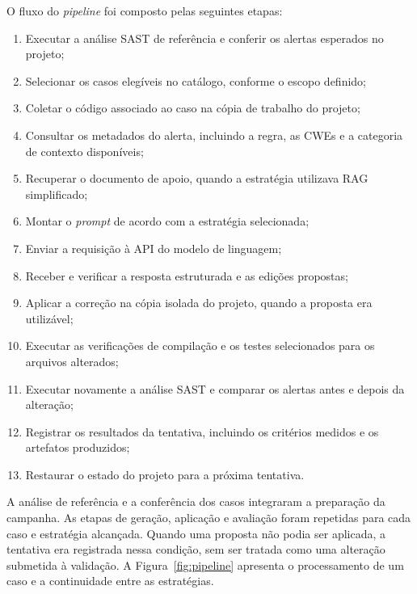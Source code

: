 O fluxo do \textit{pipeline} foi composto pelas seguintes etapas:

\begin{enumerate}
    \item Executar a análise SAST de referência e conferir os alertas esperados no projeto;
    \item Selecionar os casos elegíveis no catálogo, conforme o escopo definido;
    \item Coletar o código associado ao caso na cópia de trabalho do projeto;
    \item Consultar os metadados do alerta, incluindo a regra, as CWEs e a categoria de contexto disponíveis;
    \item Recuperar o documento de apoio, quando a estratégia utilizava RAG simplificado;
    \item Montar o \textit{prompt} de acordo com a estratégia selecionada;
    \item Enviar a requisição à API do modelo de linguagem;
    \item Receber e verificar a resposta estruturada e as edições propostas;
    \item Aplicar a correção na cópia isolada do projeto, quando a proposta era utilizável;
    \item Executar as verificações de compilação e os testes selecionados para os arquivos alterados;
    \item Executar novamente a análise SAST e comparar os alertas antes e depois da alteração;
    \item Registrar os resultados da tentativa, incluindo os critérios medidos e os artefatos produzidos;
    \item Restaurar o estado do projeto para a próxima tentativa.
\end{enumerate}

A análise de referência e a conferência dos casos integraram a preparação da campanha. As etapas de geração, aplicação e avaliação foram repetidas para cada caso e estratégia alcançada. Quando uma proposta não podia ser aplicada, a tentativa era registrada nessa condição, sem ser tratada como uma alteração submetida à validação. A Figura~\ref{fig:pipeline} apresenta o processamento de um caso e a continuidade entre as estratégias.

